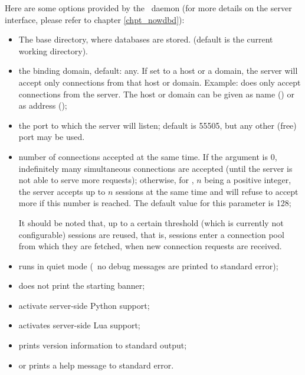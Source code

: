 \begin{minipage}{\textwidth}
Here are some options provided by
the \nowdb\ daemon
(for more details on the server interface,
please refer to chapter \ref{chpt_nowdbd}):

\begin{itemize}
\item {} The base directory,
where databases are stored.
(default is the current working directory).

\item {} the binding domain, default:
any. If set to a host or a domain, the server
will accept only connections from that host
or domain. Example:  does
only accept connections from the server.
The host or domain can be given as name ()
or as  address ();

\item {} the port to which
the server will listen; default is 55505,
but any other (free) port may be used.
 
\item {} number of connections accepted at the same time.
If the argument is 0, indefinitely many
simultaneous connections are accepted
(until the server is not able to serve more requests);
otherwise, for ,
$n$ being a positive integer,
the server accepts
up to $n$ sessions at the same time and
will refuse to accept more if this number is reached.
The default value for this parameter is 128;

It should be noted that, up to a certain threshold
(which is currently not configurable) sessions are
reused, that is, sessions enter a connection pool
from which they are fetched, when new connection
requests are received.

\item {} runs in quiet mode
(\ie\ no debug messages are printed to standard error);
\item {} does not print the starting banner;
\item {} activate server-side Python support;
\item {} activates server-side Lua support;
\item {} prints version information to standard output;
\item {} or  prints a help message to standard error.
\end{itemize}
\end{minipage}

